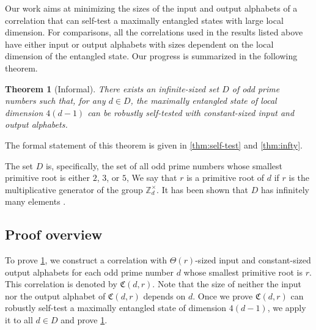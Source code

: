 \documentclass[11pt,letterpaper]{article}
\newcommand{\Z}{\mathbb{Z}}
\newcommand{\Zd}{\Z_d^{\times}}
\newcommand{\1}{\mathbb{1}}
\newcommand{\fC}{\mathfrak{C}}
\newtheorem{theorem}{Theorem}[section]
\theoremstyle{definition}
\begin{document}
 
Our work aims at minimizing the sizes of the input 
and output alphabets of a correlation that can self-test
a maximally entangled states with large local dimension.
For comparisons, all the correlations used in the results listed above
have either input or output alphabets with sizes dependent on the
local dimension of the entangled state.
Our progress is summarized in the following theorem.
\begin{theorem}[Informal]
\label{thm:inf}
	There exists an infinite-sized set $D$ of odd prime numbers such that, for any $d \in D$, 
	the maximally entangled state of local dimension $4(d-1)$ can be robustly self-tested 
	with constant-sized input and output alphabets.
\end{theorem}
The formal statement of this theorem is given in \cref{thm:self-test} and \cref{thm:infty}.

The set $D$ is, specifically, the set of all 
odd prime numbers whose smallest primitive root 
is either $2$, $3$, or $5$, 
We say that $r$ is a primitive root of $d$ if $r$ is the 
multiplicative generator of the group $\Zd$.
It has been shown that $D$ has infinitely many elements \cite{murty1988}.

\subsection{Proof overview}

To prove \cref{thm:inf}, we construct a correlation with $\Theta(r)$-sized
input and constant-sized output alphabets
for each odd prime number $d$ whose smallest primitive root is $r$.
This correlation is denoted by $\fC(d,r)$.
Note that the size of neither the input nor the output alphabet of $\fC(d,r)$ depends on $d$. 
Once we prove $\fC(d,r)$ can robustly self-test a maximally entangled
state of dimension $4(d-1)$, we apply it to all $d \in D$
and prove \cref{thm:inf}.
\end{document}
